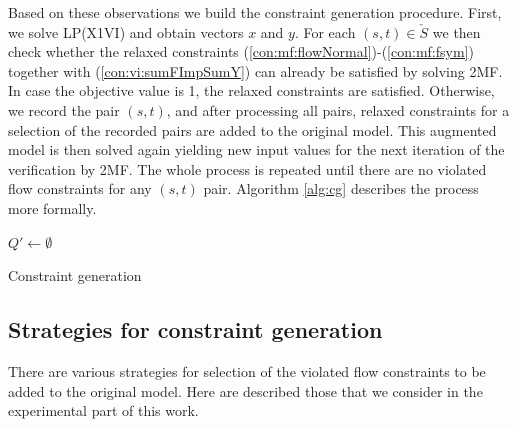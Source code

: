 Based on these observations we build the constraint generation procedure.
First, we solve LP(X1VI) and obtain vectors $x$ and $y$.
For each $(s,t)\in \check{S}$ we then check whether the relaxed constraints (\ref{con:mf:flowNormal})-(\ref{con:mf:fsym}) together with (\ref{con:vi:sumFImpSumY}) can already be satisfied by solving 2MF.
In case the objective value is 1, the relaxed constraints are satisfied.
Otherwise, we record the pair $(s,t)$, and after processing all pairs, relaxed constraints for a selection of the recorded pairs are added to the original model.
This augmented model is then solved again yielding new input values for the next iteration of the verification by 2MF.
The whole process is repeated until there are no violated flow constraints for any $(s,t)$ pair.
Algorithm \ref{alg:cg} describes the process more formally.

\begin{algorithm}
$Q'\leftarrow\emptyset$
 ~\newline
 \caption{Constraint generation}
\label{alg:cg}
\end{algorithm}

\subsection{Strategies for constraint generation}

There are various strategies for selection of the violated flow constraints to be added to the original model.
Here are described those that we consider in the experimental part of this work.

